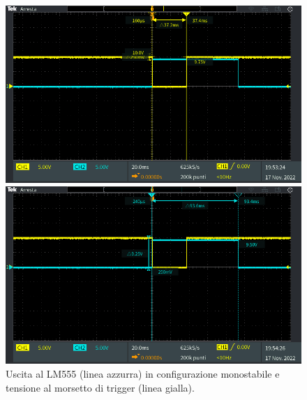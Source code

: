 \begin{figure}[tbh]
	\centering
	\begin{minipage}{.496\textwidth}
		\includegraphics[width=\linewidth]{./ImageFiles/Laboratorio 5/TEK00005.PNG}
	\end{minipage}
	\begin{minipage}{.496\textwidth}
		\includegraphics[width=\linewidth]{./ImageFiles/Laboratorio 5/TEK00006.PNG}
	\end{minipage}
	\caption{Uscita al LM555 (linea azzurra) in configurazione monostabile e tensione al morsetto di trigger (linea gialla).}
	\label{fig:circuito_1_scope}
\end{figure}



